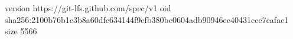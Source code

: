 version https://git-lfs.github.com/spec/v1
oid sha256:2100b76b1c3b8a60dfc634144f9efb380be0604adb90946ec40431cce7eafae1
size 5566
